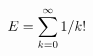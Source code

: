 \documentclass[preview]{standalone}
\begin{document}
\begin{align*}
\special{dvisvgm:raw <g id='unique000'>}E=\sum_{k=0}^{\infty}1/k!\special{dvisvgm:raw </g>}
\end{align*}
\end{document}
